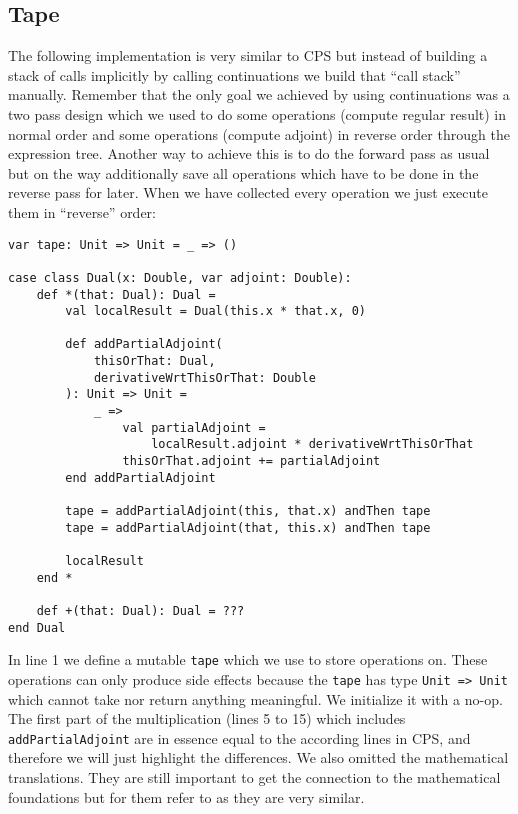 \subsection{Tape} \label{sec:tape}

The following implementation is very similar to CPS but instead of building a stack of calls implicitly by calling continuations we build that ``call stack'' manually. Remember that the only goal we achieved by using continuations was a two pass design which we used to do some operations (compute regular result) in normal order and some operations (compute adjoint) in reverse order through the expression tree. Another way to achieve this is to do the forward pass as usual but on the way additionally save all operations which have to be done in the reverse pass for later. When we have collected every operation we just execute them in ``reverse'' order:
\begin{lstlisting}[mathescape=true]
var tape: Unit => Unit = _ => ()

case class Dual(x: Double, var adjoint: Double):
    def *(that: Dual): Dual =
        val localResult = Dual(this.x * that.x, 0)

        def addPartialAdjoint(
            thisOrThat: Dual,
            derivativeWrtThisOrThat: Double
        ): Unit => Unit =
            _ =>
                val partialAdjoint = 
                    localResult.adjoint * derivativeWrtThisOrThat
                thisOrThat.adjoint += partialAdjoint
        end addPartialAdjoint

        tape = addPartialAdjoint(this, that.x) andThen tape
        tape = addPartialAdjoint(that, this.x) andThen tape

        localResult
    end *

    def +(that: Dual): Dual = ???
end Dual
\end{lstlisting}
In line 1 we define a mutable \lstinline{tape} which we use to store operations on. These operations can only produce side effects because the \lstinline{tape} has type \lstinline{Unit => Unit} which cannot take nor return anything meaningful. We initialize it with a no-op.
The first part of the multiplication (lines 5 to 15) which includes \lstinline{addPartialAdjoint} are in essence equal to the according lines in CPS, and therefore we will just highlight the differences. We also omitted the mathematical translations. They are still important to get the connection to the mathematical foundations but for them refer to  as they are very similar.

